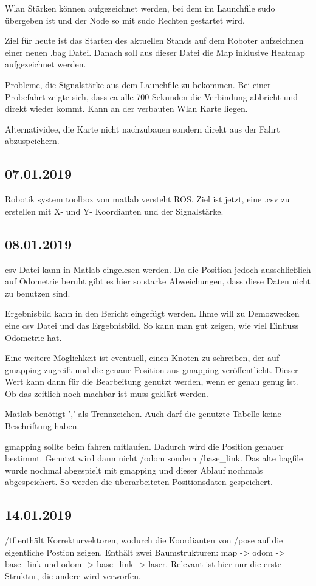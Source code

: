 \documentclass{scrartcl}%
\begin{document}
Wlan Stärken können aufgezeichnet werden, bei dem im Launchfile sudo übergeben ist und der Node so mit sudo Rechten gestartet wird.

Ziel für heute ist das Starten des aktuellen Stands auf dem Roboter aufzeichnen einer neuen .bag Datei. Danach soll aus dieser Datei die Map inklusive Heatmap aufgezeichnet werden.

Probleme, die Signalstärke aus dem Launchfile zu bekommen. Bei einer Probefahrt zeigte sich, dass ca alle 700 Sekunden die Verbindung abbricht und direkt wieder kommt. Kann an der verbauten Wlan Karte liegen.

Alternatividee, die Karte nicht nachzubauen sondern direkt aus der Fahrt abzuspeichern.

\subsection{07.01.2019}
Robotik system toolbox von matlab versteht ROS. Ziel ist jetzt, eine .csv zu erstellen mit X- und Y- Koordianten und der Signalstärke.

\subsection{08.01.2019}
csv Datei kann in Matlab eingelesen werden. Da die Position jedoch ausschließlich auf Odometrie beruht gibt es hier so starke Abweichungen, dass diese Daten nicht zu benutzen sind.

Ergebnisbild kann in den Bericht eingefügt werden. Ihme will zu Demozwecken eine csv Datei und das Ergebnisbild. So kann man gut zeigen, wie viel Einfluss Odometrie hat.

Eine weitere Möglichkeit ist eventuell, einen Knoten zu schreiben, der auf gmapping zugreift und die genaue Position aus gmapping veröffentlicht. Dieser Wert kann dann für die Bearbeitung genutzt werden, wenn er genau genug ist. Ob das zeitlich noch machbar ist muss geklärt werden.

Matlab benötigt ',' als Trennzeichen. Auch darf die genutzte Tabelle keine Beschriftung haben.

gmapping sollte beim fahren mitlaufen. Dadurch wird die Position genauer bestimmt. Genutzt wird dann nicht /odom sondern /base\_link. Das alte bagfile wurde nochmal abgespielt mit gmapping und dieser Ablauf nochmals abgespeichert. So werden die überarbeiteten Positionsdaten gespeichert.


\subsection{14.01.2019}
/tf enthält Korrekturvektoren, wodurch die Koordianten von /pose auf die eigentliche Postion zeigen. Enthält zwei Baumstrukturen: map -> odom -> base\_link und odom -> base\_link -> laser. Relevant ist hier nur die erste Struktur, die andere wird verworfen.
\end{document}
